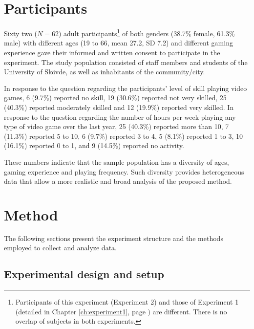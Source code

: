 \section{Participants}

Sixty two ($N=62$) adult participants\footnote{Participants of this experiment (Experiment 2) and those of Experiment 1 (detailed in Chapter \ref{ch:experiment1}, page \pageref{ch:experiment1}) are different. There is no overlap of subjects in both experiments.} of both genders (38.7\% female, 61.3\% male) with different ages (19 to 66, mean 27.2, SD 7.2) and different gaming experience gave their informed and written consent to participate in the experiment. The study population consisted of staff members and students of the University of Sk\"ovde, as well as inhabitants of the community/city.

In response to the question regarding the participants' level of skill playing video games, 6 (9.7\%) reported no skill, 19 (30.6\%) reported not very skilled, 25 (40.3\%) reported moderately skilled and 12 (19.9\%) reported very skilled. In response to the question regarding the number of hours per week playing any type of video game over the last year, 25 (40.3\%) reported more than 10, 7 (11.3\%) reported 5 to 10, 6 (9.7\%) reported 3 to 4, 5 (8.1\%) reported 1 to 3, 10 (16.1\%) reported 0 to 1, and 9 (14.5\%) reported no activity.

These numbers indicate that the sample population has a diversity of ages, gaming experience and playing frequency. Such diversity provides heterogeneous data that allow a more realistic and broad analysis of the proposed method.

\section{Method}
\label{sec:experiment2-method}

The following sections present the experiment structure and the methods employed to collect and analyze data.

\subsection{Experimental design and setup}

